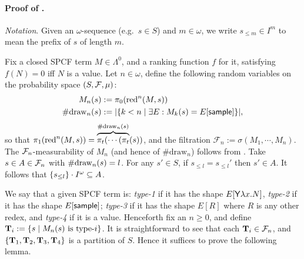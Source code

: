 \paragraph{Proof of .}
\emph{Notation}. Given an $\omega$-sequence (e.g.~$s \in S$) and $m \in \omega$, we write $s_{\leq m} \in I^m$ to mean the prefix of $s$ of length $m$.

Fix a closed SPCF term $M \in \Lambda^0$, and a ranking function $f$ for it, satisfying $f(N) = 0$ iff $N$ is a value.
Let $n \in \omega$, define the following random variables on the probability space $(S, \mathcal{F}, \mu)$:
\begin{align*}
M_n(s) &:= \pi_0 (\operatorname{red}^n(M, s))\\
\#\mathrm{draw}_{n}(s) &:= |\{k < n \mid \exists E: M_k(s) = E[\mathsf{sample}]\}|,
\end{align*}
 so that $\pi_1 (\operatorname{red}^n(M, s)) = \overbrace{\pi_t( \cdots (\pi_t}^{\#\mathrm{draw}_{n}(s)}(s))$, and the filtration $\mathcal{F}_n := \sigma(M_1, \cdots, M_n)$.
The $\mathcal{F}_n$-measurability of $M_n$ (and hence of $\#\mathrm{draw}_n$) follows from \citep{DBLP:conf/icfp/BorgstromLGS16}.
 
Take $s \in A \in \mathcal{F}_n$ with $\#\mathrm{draw}_{n}(s) = l$.
For any $s'\in S$, if $s_{\leq l} = s_{\leq l}'$ then $s' \in A$.
It follows that ${\{s_{\leq l}\} \cdot I^\omega} \subseteq A$.

\iffalse
\lo{We need to show that each $f(M_n)$ is integrable. LO claimed earlier that $0 \leq f(N) \leq f(M)$ for all $N \in \mathit{Rch}(M)$.
This is of false: take $f$ with $v \, \tsample \mapsto 1$ and $v \, \underline{r} \mapsto 2\, r$ for some value $v$. 
However, it is true that
\[
\int_{S} \mu(\dif s) \, |f(M_n)(s)| 
=
\int_{S} \mu(\dif s) \, f(M_n)(s)
\leq
\int_{S} \mu(\dif s) \, f(M_0)(s)
=
f(M)
\]
the inequality above follows from \Cref{lem:key rankable}.
}
\fi

We say that a given SPCF term is: %
\emph{type-1} if it has the shape $E[\mathsf{Y} \lambda x. N]$, \emph{type-2} if it has the shape $E[\mathsf{sample}]$; \emph{type-3} if it has the shape $E[R]$ where $R$ is any other redex, and \emph{type-4} if it is a value.
Henceforth fix an $n \geq 0$, and define $\mathbf{T}_i := \{s \mid M_n(s) \hbox{ is type-$i$}\}$.
It is straightforward to see that each $\mathbf{T}_i \in \mathcal{F}_n$, and $\{\mathbf{T}_1, \mathbf{T}_2, \mathbf{T}_3, \mathbf{T}_4\}$ is a partition of $S$.
Hence it suffices to prove the following lemma.

